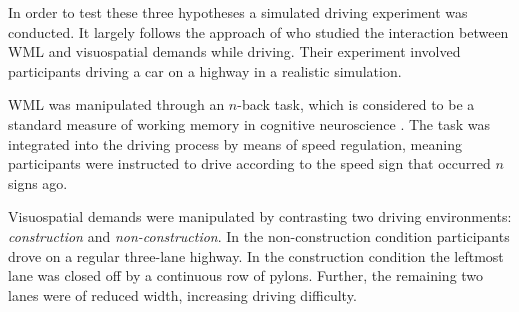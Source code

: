 In order to test these three hypotheses a simulated driving experiment was conducted.
It largely follows the approach of \citet{Scheunemann2019} who studied the interaction between WML and visuospatial demands while driving.
Their experiment involved participants driving a car on a highway in a realistic simulation. 

WML was manipulated through an \(n\)-back task, which is considered to be a standard measure of working memory in cognitive neuroscience \citep{Kane2007}.
The task was integrated into the driving process by means of speed regulation, meaning participants were instructed to drive according to the speed sign that occurred \(n\) signs ago.

Visuospatial demands were manipulated by contrasting two driving environments: \textit{construction} and \textit{non-construction}.
In the non-construction condition participants drove on a regular three-lane highway.
In the construction condition the leftmost lane was closed off by a continuous row of pylons.
Further, the remaining two lanes were of reduced width, increasing driving difficulty.